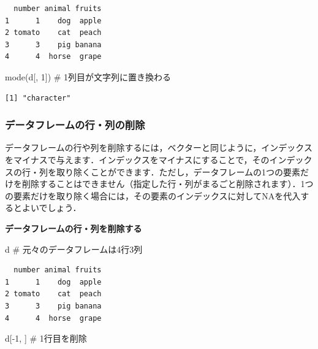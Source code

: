 \documentclass[
  letterpaper,
  DIV=11,
  numbers=noendperiod]{scrreprt}
\newenvironment{Shaded}{\begin{snugshade}}{\end{snugshade}}
\newcommand{\CommentTok}[1]{\textcolor[rgb]{0.37,0.37,0.37}{#1}}
\newcommand{\DecValTok}[1]{\textcolor[rgb]{0.68,0.00,0.00}{#1}}
\newcommand{\FunctionTok}[1]{\textcolor[rgb]{0.28,0.35,0.67}{#1}}
\newcommand{\NormalTok}[1]{\textcolor[rgb]{0.00,0.23,0.31}{#1}}
\newcommand{\SpecialCharTok}[1]{\textcolor[rgb]{0.37,0.37,0.37}{#1}}
\begin{document}
\begin{verbatim}
  number animal fruits
1      1    dog  apple
2 tomato    cat  peach
3      3    pig banana
4      4  horse  grape
\end{verbatim}

\begin{Shaded}
\begin{Highlighting}[]
\FunctionTok{mode}\NormalTok{(d[, }\DecValTok{1}\NormalTok{]) }\CommentTok{\# 1列目が文字列に置き換わる}
\end{Highlighting}
\end{Shaded}

\begin{verbatim}
[1] "character"
\end{verbatim}

\hypertarget{ux30c7ux30fcux30bfux30d5ux30ecux30fcux30e0ux306eux884cux5217ux306eux524aux9664}{%
\subsubsection{データフレームの行・列の削除}\label{ux30c7ux30fcux30bfux30d5ux30ecux30fcux30e0ux306eux884cux5217ux306eux524aux9664}}

データフレームの行や列を削除するには，ベクターと同じように，インデックスをマイナスで与えます．インデックスをマイナスにすることで，そのインデックスの行・列を取り除くことができます．ただし，データフレームの1つの要素だけを削除することはできません（指定した行・列がまるごと削除されます）．1つの要素だけを取り除く場合には，その要素のインデックスに対してNAを代入するとよいでしょう．

\textbf{データフレームの行・列を削除する}

\begin{Shaded}
\begin{Highlighting}[]
\NormalTok{d }\CommentTok{\# 元々のデータフレームは4行3列}
\end{Highlighting}
\end{Shaded}

\begin{verbatim}
  number animal fruits
1      1    dog  apple
2 tomato    cat  peach
3      3    pig banana
4      4  horse  grape
\end{verbatim}

\begin{Shaded}
\begin{Highlighting}[]
\NormalTok{d[}\SpecialCharTok{{-}}\DecValTok{1}\NormalTok{, ] }\CommentTok{\# 1行目を削除}
\end{Highlighting}
\end{Shaded}
\end{document}
